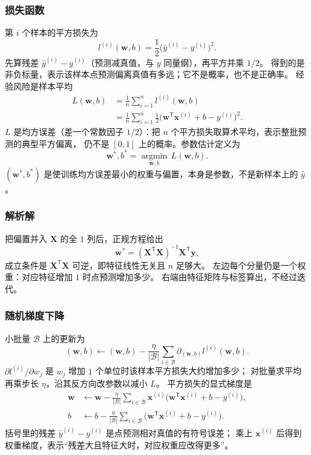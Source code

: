 \subsubsection{损失函数}

第 $i$ 个样本的平方损失为
\[
l^{(i)}(\bm{w},b)=\frac{1}{2}\bigl(\hat{y}^{(i)}-y^{(i)}\bigr)^{2}.
\]
先算残差 $\hat{y}^{(i)}-y^{(i)}$（预测减真值，与 $y$ 同量纲），再平方并乘 $1/2$。
得到的是非负标量，表示该样本点预测偏离真值有多远；它不是概率，也不是正确率。
经验风险是样本平均
\begin{align*}
L(\bm{w},b)
&=\frac{1}{n}\sum_{i=1}^{n}l^{(i)}(\bm{w},b)\\
&=\frac{1}{n}\sum_{i=1}^{n}\frac{1}{2}\bigl(\bm{w}^{\mathsf T}\bm{x}^{(i)}+b-y^{(i)}\bigr)^{2}.
\end{align*}
$L$ 是均方误差（差一个常数因子 $1/2$）：把 $n$ 个平方损失取算术平均，表示整批预测的典型平方偏离，
仍不是 $[0,1]$ 上的概率。参数估计定义为
\[
\bm{w}^{\ast},b^{\ast}=\operatorname*{argmin}_{\bm{w},b}\,L(\bm{w},b).
\]
$(\bm{w}^{\ast},b^{\ast})$ 是使训练均方误差最小的权重与偏置，本身是参数，不是新样本上的 $\hat{y}$。

\subsubsection{解析解}

把偏置并入 $\bm{X}$ 的全 $1$ 列后，正规方程给出
\[
\bm{w}^{\ast}=(\bm{X}^{\mathsf T}\bm{X})^{-1}\bm{X}^{\mathsf T}\bm{y},
\]
成立条件是 $\bm{X}^{\mathsf T}\bm{X}$ 可逆，即特征线性无关且 $n$ 足够大。
左边每个分量仍是一个权重：对应特征增加 $1$ 时点预测增加多少。
右端由特征矩阵与标签算出，不经过迭代。

\subsubsection{随机梯度下降}

小批量 $\mathcal{B}$ 上的更新为
\[
(\bm{w},b)
\leftarrow
(\bm{w},b)
-
\frac{\eta}{|\mathcal{B}|}
\sum_{i\in\mathcal{B}}
\partial_{(\bm{w},b)}l^{(i)}(\bm{w},b).
\]
$\partial l^{(i)}/\partial w_j$ 是 $w_j$ 增加 $1$ 个单位时该样本平方损失大约增加多少；
对批量求平均再乘步长 $\eta$，沿其反方向改参数以减小 $L$。
平方损失的显式梯度是
\begin{align*}
\bm{w}
&\leftarrow
\bm{w}
-
\frac{\eta}{|\mathcal{B}|}
\sum_{i\in\mathcal{B}}
\bm{x}^{(i)}
\bigl(\bm{w}^{\mathsf T}\bm{x}^{(i)}+b-y^{(i)}\bigr),\\
b
&\leftarrow
b
-
\frac{\eta}{|\mathcal{B}|}
\sum_{i\in\mathcal{B}}
\bigl(\bm{w}^{\mathsf T}\bm{x}^{(i)}+b-y^{(i)}\bigr).
\end{align*}
括号里的残差 $\hat{y}^{(i)}-y^{(i)}$ 是点预测相对真值的有符号误差；
乘上 $\bm{x}^{(i)}$ 后得到权重梯度，表示“残差大且特征大时，对应权重应改得更多”。

